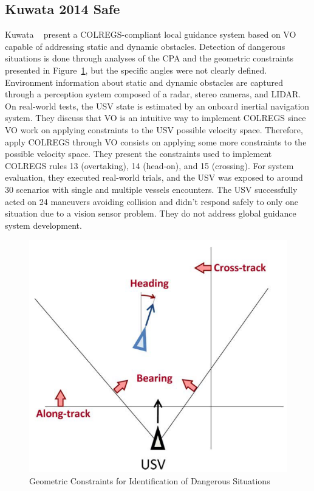     \subsection{Kuwata 2014 Safe}
    Kuwata \etal~\cite{Kuwata2014Safe} present a \ac{COLREGS}-compliant local guidance system based on \ac{VO} capable of addressing static and dynamic obstacles. Detection of dangerous situations is done through analyses of the \ac{CPA} and the geometric constraints presented in Figure~\ref{fig:Kuwata2014Safe_GeometricConstraints}, but the specific angles were not clearly defined. Environment information about static and dynamic obstacles are captured through a perception system composed of a radar, stereo cameras, and \ac{LIDAR}. On real-world tests, the \ac{USV} state is estimated by an onboard inertial navigation system. They discuss that \ac{VO} is an intuitive way to implement \ac{COLREGS} since \ac{VO} work on applying constraints to the \ac{USV} possible velocity space. Therefore, apply \ac{COLREGS} through \ac{VO} consists on applying some more constraints to the possible velocity space. They present the constraints used to implement \ac{COLREGS} rules 13 (overtaking), 14 (head-on), and 15 (crossing). For system evaluation, they executed real-world trials, and the \ac{USV} was exposed to around 30 scenarios with single and multiple vessels encounters. The \ac{USV} successfully acted on 24 maneuvers avoiding collision and didn't respond safely to only one situation due to a vision sensor problem. They do not address global guidance system development.
    
    \begin{figure}[H]
        \centering
        \includegraphics[scale=0.4]{figs/Chap3/Kuwata2014Safe_GeometricConstraints.png}
        \caption{Geometric Constraints for Identification of Dangerous Situations \cite{Kuwata2014Safe}}
        \label{fig:Kuwata2014Safe_GeometricConstraints}
    \end{figure}
    
